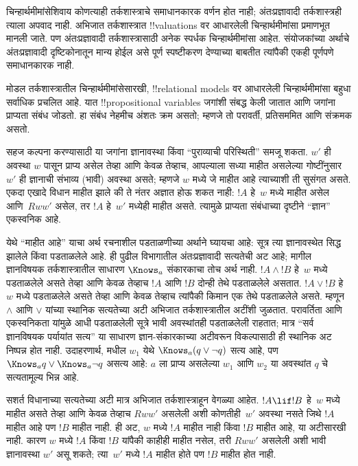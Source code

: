 \documentclass[../../../include/open-logic-section]{subfiles}
\begin{document}


चिन्हार्थमीमांसेशिवाय कोणत्याही तर्कशास्त्राचे
समाधानकारक वर्णन होत नाही; अंतःप्रज्ञावादी
तर्कशास्त्रही त्याला अपवाद नाही. अभिजात
तर्कशास्त्रात !!{valuation}s वर आधारलेली
चिन्हार्थमीमांसा प्रमाणभूत मानली जाते. पण
अंतःप्रज्ञावादी तर्कशास्त्रासाठी अनेक स्पर्धक
चिन्हार्थमीमांसा आहेत. संयोजकांच्या अर्थाचे
अंतःप्रज्ञावादी दृष्टिकोनातून मान्य होईल असे
पूर्ण स्पष्टीकरण देण्याच्या बाबतीत त्यांपैकी
एकही पूर्णपणे समाधानकारक नाही.

मोडल तर्कशास्त्रातील चिन्हार्थमीमांसेसारखी,
!!{relational model}s वर आधारलेली चिन्हार्थमीमांसा
बहुधा सर्वाधिक प्रचलित आहे. यात !!{propositional variable}s
जगांशी संबद्ध केली जातात आणि जगांना प्राप्यता
संबंध जोडतो. हा संबंध नेहमीच अंशतः क्रम असतो;
म्हणजे तो परावर्ती, प्रतिसममित आणि संक्रमक असतो.

सहज कल्पना करण्यासाठी या जगांना ज्ञानावस्था किंवा
“पुराव्याची परिस्थिती” समजू शकता. $w'$ ही अवस्था
$w$ पासून प्राप्य असेल तेव्हा आणि केवळ तेव्हाच,
आपल्याला सध्या माहीत असलेल्या गोष्टींनुसार $w'$
ही ज्ञानाची संभाव्य (भावी) अवस्था असते; म्हणजे
$w$ मध्ये जे माहीत आहे त्याच्याशी ती सुसंगत असते.
एकदा एखादे विधान माहीत झाले की ते नंतर अज्ञात
होऊ शकत नाही: $!A$ हे~$w$ मध्ये माहीत असेल
आणि~$Rww'$ असेल, तर $!A$ हे~$w'$ मध्येही माहीत
असते. त्यामुळे प्राप्यता संबंधाच्या दृष्टीने
“ज्ञान” एकस्वनिक आहे.

येथे “माहीत आहे” याचा अर्थ रचनाशील पडताळणीच्या
अर्थाने घ्यायचा आहे: सूत्र त्या ज्ञानावस्थेत सिद्ध झालेले
किंवा पडताळलेले आहे. ही पुढील विभागातील अंतःप्रज्ञावादी
सत्यतेची अट आहे; मागील ज्ञानविषयक तर्कशास्त्रातील
साधारण $\Knows_a$ संकारकाचा तोच अर्थ नाही.
$!A\land !B$ हे~$w$ मध्ये पडताळलेले असते तेव्हा
आणि केवळ तेव्हाच $!A$ आणि $!B$ दोन्ही तेथे पडताळलेले
असतात. $!A\lor !B$ हे~$w$ मध्ये पडताळलेले असते
तेव्हा आणि केवळ तेव्हाच त्यांपैकी किमान एक तेथे
पडताळलेले असते. म्हणून $\land$ आणि $\lor$ यांच्या
स्थानिक सत्यतेच्या अटी अभिजात तर्कशास्त्रातील अटींशी जुळतात.
परावर्तिता आणि एकस्वनिकता यांमुळे आधी पडताळलेली सूत्रे
भावी अवस्थांतही पडताळलेली राहतात; मात्र “सर्व ज्ञानविषयक
पर्यायांत सत्य” या साधारण ज्ञान-संकारकाच्या अटीवरून
विकल्पासाठी ही स्थानिक अट निष्पन्न होत नाही.
उदाहरणार्थ,  मधील $w_1$
येथे $\Knows_a(q\lor\lnot q)$ सत्य आहे, पण
$\Knows_a q\lor\Knows_a\lnot q$ असत्य आहे:
$a$ ला प्राप्य असलेल्या $w_1$ आणि $w_2$ या अवस्थांत
$q$ चे सत्यतामूल्य भिन्न आहे.

सशर्त विधानाच्या सत्यतेच्या अटी मात्र अभिजात
तर्कशास्त्राहून वेगळ्या आहेत. $!A \lif !B$
हे~$w$ मध्ये माहीत असते तेव्हा आणि केवळ तेव्हाच
$Rww'$ असलेली अशी कोणतीही~$w'$ अवस्था नसते
जिथे $!A$ माहीत आहे पण $!B$ माहीत नाही.
ही अट, $w$ मध्ये $!A$ माहीत नाही किंवा
$!B$ माहीत आहे, या अटीसारखी नाही. कारण
$w$ मध्ये $!A$ किंवा $!B$ यांपैकी काहीही माहीत
नसेल, तरी $Rww'$ असलेली अशी भावी ज्ञानावस्था
$w'$ असू शकते; त्या~$w'$ मध्ये $!A$ माहीत होते
पण $!B$ माहीत होत नाही.
\end{document}
